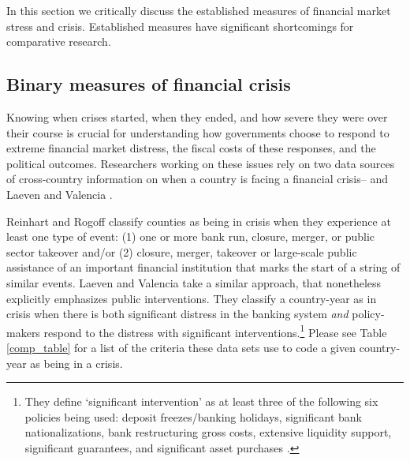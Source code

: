 \documentclass[]{article}
\begin{document}
In this section we critically discuss the established measures of financial market stress and crisis. Established measures have significant shortcomings for comparative research.

\subsection{Binary measures of financial crisis}

Knowing when crises started, when they ended, and how severe they were over their course is crucial for understanding how governments choose to respond to extreme financial market distress, the fiscal costs of these responses, and the political outcomes. Researchers working on these issues rely on two data sources of cross-country information on when a country is facing a financial crisis--\cite{Reinhart2009,ReinhartRog2010} and Laeven and Valencia \citeyearpar[and their predecessors]{laeven2013}.

Reinhart and Rogoff \citeyearpar[10]{Reinhart2009,ReinhartRog2010} classify counties as being in crisis when they experience at least one type of event: (1) one or more bank run, closure, merger, or public sector takeover and/or (2) closure, merger, takeover or large-scale public assistance of an important financial institution that marks the start of a string of similar events. Laeven and Valencia \citeyearpar[228]{laeven2013} take a similar approach, that nonetheless explicitly emphasizes public interventions. They classify a country-year as in crisis when there is both significant distress in the banking system \emph{and} policy-makers respond to the distress with significant interventions.\footnote{They define `significant intervention' as at least three of the following six policies being used: deposit freezes/banking holidays, significant bank nationalizations, bank restructuring gross costs, extensive liquidity support, significant guarantees, and significant asset purchases \cite[][229]{laeven2013}.} Please see Table \ref{comp_table} for a list of the criteria these data sets use to code a given country-year as being in a crisis.
\end{document}
